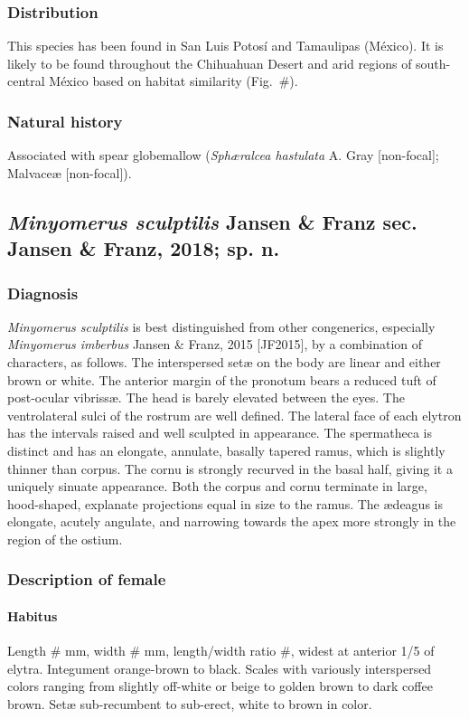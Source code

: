 \documentclass[fleqn,10pt,lineno]{wlpeerj} %
\begin{document}
		\subsubsection*{Distribution}
			This species has been found in San Luis Potos\'{i} and Tamaulipas (M\'{e}xico).
			It is likely to be found throughout the Chihuahuan Desert and arid regions of south-central M\'{e}xico based on habitat similarity (Fig.~\#).
		\subsubsection*{Natural history}
			Associated with spear globemallow (\textit{Sph{\ae}ralcea hastulata} A. Gray [non-focal]; Malvace{\ae} [non-focal]).

	\subsection*{\textit{Minyomerus sculptilis} Jansen \& Franz sec. Jansen \& Franz, 2018; sp. n.}
		\subsubsection*{Diagnosis}
			\textit{Minyomerus sculptilis} is best distinguished from other congenerics, especially \textit{Minyomerus imberbus} Jansen \& Franz, 2015 [JF2015], by a combination of characters, as follows.
			The interspersed set{\ae} on the body are linear and either brown or white.
			The anterior margin of the pronotum bears a reduced tuft of post-ocular vibriss{\ae}.
			The head is barely elevated between the eyes.
			The ventrolateral sulci of  the rostrum are well defined.
			The lateral face of each elytron has the intervals raised and well sculpted in appearance.
			The spermatheca is distinct and has an elongate, annulate, basally tapered ramus, which is slightly thinner than corpus.
			The cornu is strongly recurved in the basal half, giving it a uniquely sinuate appearance.
			Both the corpus and cornu terminate in large, hood-shaped, explanate projections equal in size to the ramus.
			The {\ae}deagus is elongate, acutely angulate, and narrowing towards the apex more strongly in the region of the ostium.
		\subsubsection*{Description of female}
			\paragraph{Habitus}
				Length \# mm, width \# mm, length/width ratio \#, widest at anterior 1/5 of elytra.
				Integument orange-brown to black.
				Scales with variously interspersed colors ranging from slightly off-white or beige to golden brown to dark coffee brown.
				Set{\ae} sub-recumbent to sub-erect, white to brown in color.
\end{document}
